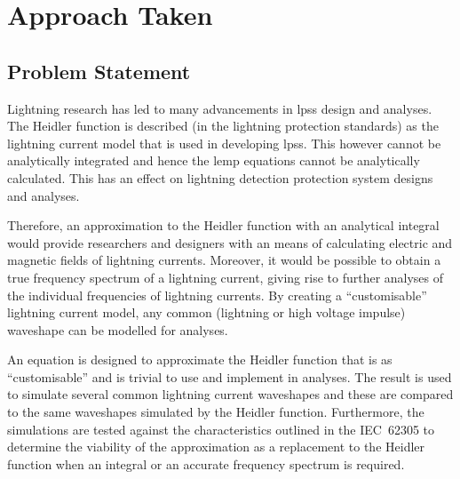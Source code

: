 
\chapter{Approach Taken} %

\label{ChapterApproach} %

\begin{quote}
\end{quote}


\section{Problem Statement}
\label{sec:approach_problem_statement}
Lightning research has led to many advancements in \glspl{lps} design and analyses. The Heidler function is described (in the lightning protection standards) as the lightning current model that is used in developing \glspl{lps}. This however cannot be analytically integrated and hence the \gls{lemp} equations cannot be analytically calculated. This has an effect on lightning detection protection system designs and analyses.

Therefore, an approximation to the Heidler function with an analytical integral would provide researchers and designers with an means of calculating electric and magnetic fields of lightning currents. Moreover, it would be possible to obtain a true frequency spectrum of a lightning current, giving rise to further analyses of the individual frequencies of lightning currents. By creating a ``customisable'' lightning current model, any common (lightning or high voltage impulse) waveshape can be modelled for analyses.

An equation is designed to approximate the Heidler function that is as ``customisable'' and is trivial to use and implement in analyses. The result is used to simulate several common lightning current waveshapes and these are compared to the same waveshapes simulated by the Heidler function. Furthermore, the simulations are tested against the characteristics outlined in the IEC~62305 to determine the viability of the approximation as a replacement to the Heidler function when an integral or an accurate frequency spectrum is required.

